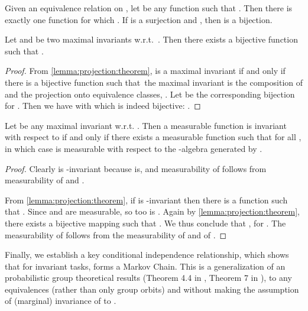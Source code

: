 \documentclass[final]{article}
\begin{document}
\begin{lemma}
\label{lemma:projection:theorem}
Given an equivalence relation  on , let  be any function such that . Then there is exactly one function  for which . If  is a surjection and , then  is a bijection.
\end{lemma}

\begin{lemma}\label{lemma:maxinv_bijection}
Let  and  be two maximal invariants w.r.t.\ . Then there exists a bijective function  such that .
\end{lemma}
\begin{proof}
From \cref{lemma:projection:theorem},  is a maximal invariant if and only if there is a bijective function  such that\ the maximal invariant is the composition of  and the projection onto equivalence classes, \ie .
Let  be the corresponding bijection for .
Then we have  with  which is indeed bijective: .
\end{proof}

\begin{lemma}\label{lemma:maxinv_invariance}
Let  be any maximal invariant w.r.t. .
Then a measurable function  is invariant with respect to  if and only if there exists a measurable function  such that  for all , in which case  is measurable with respect to the -algebra generated by .
\end{lemma}
\begin{proof}
Clearly  is -invariant because  is, and measurability of  follows from measurability of  and .

From \cref{lemma:projection:theorem}, if  is -invariant then there is a function  such that . Since  and  are measurable, so too is . 
Again by \cref{lemma:projection:theorem}, there exists a bijective mapping  such that .
We thus conclude that , for .
The measurability of  follows from the measurability of  and of . 
\end{proof}

Finally, we establish a key conditional independence relationship, which shows that for invariant tasks,   forms a Markov Chain. 
This is a generalization of an probabilistic group theoretical results (Theorem 4.4 in \citet{eaton_group_1989}, Theorem 7 in \citet{bloem-reddy_probabilistic_2020}), to any equivalences (rather than only group orbits) and without making the assumption of (marginal) invariance of  to .
\end{document}

